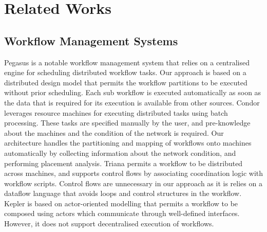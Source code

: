 \documentclass[10pt, conference, compsocconf]{IEEEtran}
\begin{document}
\section{Related Works}\label{RelatedWorks}

\subsection{Workflow Management Systems}
Pegasus \cite{Pegasus} is a notable workflow management system that relies on a centralised engine for scheduling distributed workflow tasks.
Our approach is based on a distributed design model that permits the workflow partitions to be executed without prior scheduling.
Each sub workflow is executed automatically as soon as the data that is required for its execution is available from other sources.
Condor \cite{Condor} leverages resource machines for executing distributed tasks using batch processing.
These tasks are specified manually by the user, and pre-knowledge about the machines and the condition of the network is required.
Our architecture handles the partitioning and mapping of workflows onto machines automatically by collecting information about the network condition, and performing placement analysis.
Triana \cite{Triana} permits a workflow to be distributed across machines, and supports control flows by associating coordination logic with workflow scripts.
Control flows are unnecessary in our approach as it is relies on a dataflow language that avoids loops and control structures in the workflow.
Kepler \cite{Kepler} is based on actor-oriented modelling that permits a workflow to be composed using actors which communicate through well-defined interfaces.
However, it does not support decentralised execution of workflows.
\end{document}
